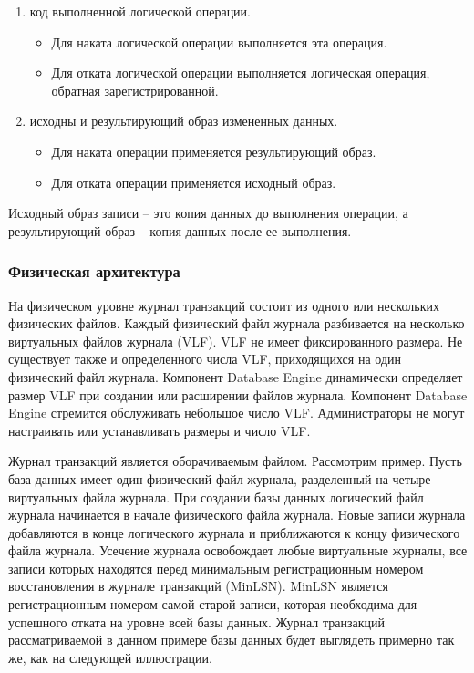 \begin{enumerate}
	\item код выполненной логической операции.
	\begin{itemize}
		\item Для наката логической операции выполняется эта операция.
		\item Для отката логической операции выполняется логическая операция, обратная зарегистрированной.
	\end{itemize}
	\item исходны и результирующий образ измененных данных.
	\begin{itemize}
		\item Для наката операции применяется результирующий образ.
		\item Для отката операции применяется исходный образ.
	\end{itemize}
\end{enumerate}

Исходный образ записи – это копия данных до выполнения операции, а результирующий образ – копия данных после ее выполнения. 

\subsubsection{Физическая архитектура}

На физическом уровне журнал транзакций состоит из одного или
нескольких физических файлов. Каждый физический файл журнала
разбивается на несколько виртуальных файлов журнала (VLF). VLF не
имеет фиксированного размера. Не существует также и определенного
числа VLF, приходящихся на один физический файл журнала. Компонент
Database Engine динамически определяет размер VLF при создании или
расширении файлов журнала. Компонент Database Engine стремится
обслуживать небольшое число VLF. Администраторы не могут настраивать
или устанавливать размеры и число VLF.

Журнал транзакций является оборачиваемым файлом. Рассмотрим
пример. Пусть база данных имеет один физический файл журнала,
разделенный на четыре виртуальных файла журнала. При создании базы
данных логический файл журнала начинается в начале физического файла
журнала. Новые записи журнала добавляются в конце логического журнала
и приближаются к концу физического файла журнала. Усечение журнала
освобождает любые виртуальные журналы, все записи которых находятся
перед минимальным регистрационным номером восстановления в журнале
транзакций (MinLSN). MinLSN является регистрационным номером самой
старой записи, которая необходима для успешного отката на уровне всей базы данных. Журнал транзакций рассматриваемой в данном примере
базы данных будет выглядеть примерно так же, как на следующей
иллюстрации.

